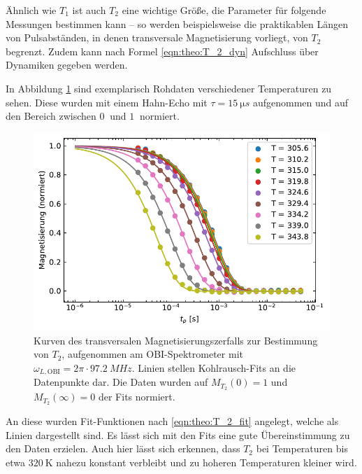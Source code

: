 \par\bigskip


Ähnlich wie $T_1$ ist auch $T_2$ eine wichtige Größe, die Parameter für folgende Messungen bestimmen kann -- so werden beispielsweise die praktikablen Längen von Pulsabständen, in denen transversale Magnetisierung vorliegt, von $T_2$ begrenzt. Zudem kann nach Formel \eqref{eqn:theo:T_2_dyn} Aufschluss über Dynamiken gegeben werden.

In Abbildung \ref{fig:res:T_2_roh} sind exemplarisch Rohdaten verschiedener Temperaturen zu sehen. Diese wurden mit einem Hahn-Echo mit $\tau = \SI{15}{\micro s}$ aufgenommen und auf den Bereich zwischen $\SI{0}{}$ und $\SI{1}{}$ normiert.
\begin{figure}
	\begin{center}
		\includegraphics[width=.8\textwidth]{graphics/plot/t2_roh3.pdf}
	\end{center}
	\caption{Kurven des transversalen Magnetisierungszerfalls zur Bestimmung von $T_2$, aufgenommen am OBI-Spektrometer mit $\omega_{L, \text{OBI}} = 2\pi \cdot \SI{97.2}{MHz}$. Linien stellen Kohlrausch-Fits an die Datenpunkte dar. Die Daten wurden auf $M_{T_2}(0) = 1$ und $M_{T_2}(\infty) = 0$ der Fits normiert.} \label{fig:res:T_2_roh}
\end{figure}
An diese wurden Fit-Funktionen nach \eqref{eqn:theo:T_2_fit} angelegt, welche als Linien dargestellt sind. Es lässt sich mit den Fits eine gute Übereinstimmung zu den Daten erzielen. Auch hier lässt sich erkennen, dass $T_2$ bei Temperaturen bis etwa $\SI{320}{\kelvin}$ nahezu konstant verbleibt und zu hoheren Temperaturen kleiner wird.

